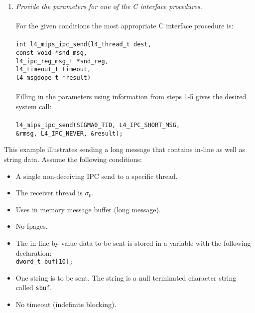 \begin{enumerate}
\item \emph{Provide the parameters for one of the C interface 
    procedures.} \\ \\ \hspace*{10pt}
  For the given conditions the most appropriate C interface procedure 
  is:\\ \\
  \hspace*{20pt} {\footnotesize\verb+int l4_mips_ipc_send(l4_thread_t dest,+} \\ 
  \hspace*{130pt} {\footnotesize\verb+const void *snd_msg,+} \\
  \hspace*{130pt} {\footnotesize\verb+l4_ipc_reg_msg_t *snd_reg,+}\\ 
  \hspace*{130pt} {\footnotesize\verb+l4_timeout_t timeout,+}\\ 
  \hspace*{130pt} {\footnotesize\verb+l4_msgdope_t *result)+}\\ \\
  \hspace*{10pt} Filling in the parameters using information from steps
  1-5 gives the desired system call: \\ \\
  \hspace*{20pt} {\footnotesize\verb+l4_mips_ipc_send(SIGMA0_TID, L4_IPC_SHORT_MSG,+}\\
  \hspace*{140pt} {\footnotesize\verb+&rmsg, L4_IPC_NEVER, &result);+}

\end{enumerate}  


This example illustrates sending a long message that contains in-line
as well as string data. Assume the following conditions:

\begin{itemize}

\item A single non-deceiving IPC send to a specific thread.
\item The receiver thread is $\sigma_0$.
\item Uses in memory message buffer (long message).
\item No fpages.
\item The in-line by-value data to be sent is stored in a variable
  with the following declaration: \\
  \hspace*{20pt} {\footnotesize\verb+dword_t buf[10];+}
\item One string is to be sent. The string is a null terminated
  character string called {\footnotesize\verb+sbuf+}.
\item No timeout (indefinite blocking).
  
\end{itemize}

